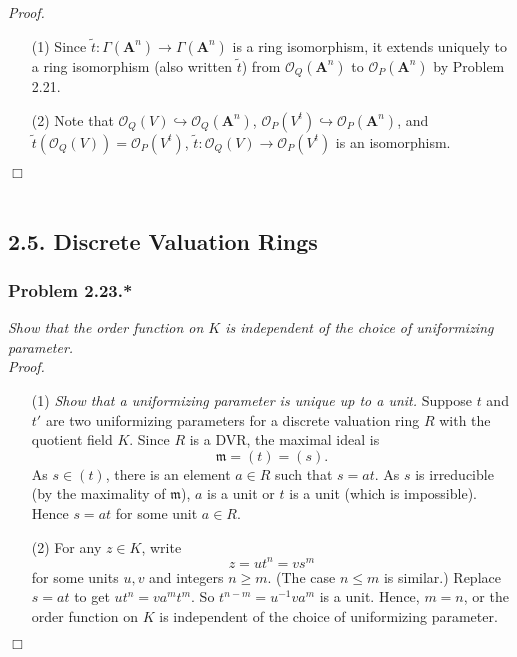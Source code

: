 \documentclass{article}
\begin{document}
\emph{Proof.}
\begin{enumerate}
\item[(1)]
  Since $\widetilde{t}: \Gamma(\mathbf{A}^{n}) \to \Gamma(\mathbf{A}^{n})$ is a ring isomorphism,
  it extends uniquely to a ring isomorphism (also written $\widetilde{t}$)
  from $\mathscr{O}_Q(\mathbf{A}^{n})$ to $\mathscr{O}_P(\mathbf{A}^{n})$
  by Problem 2.21.

\item[(2)]
  Note that $\mathscr{O}_Q(V) \hookrightarrow \mathscr{O}_Q(\mathbf{A}^{n})$,
  $\mathscr{O}_P(V^{t}) \hookrightarrow \mathscr{O}_P(\mathbf{A}^{n})$,
  and $\widetilde{t}(\mathscr{O}_Q(V)) = \mathscr{O}_P(V^{t})$,
  $\widetilde{t}: \mathscr{O}_Q(V) \to \mathscr{O}_P(V^{t})$ is an isomorphism.
\end{enumerate}
$\Box$ \\\\






\subsection*{2.5. Discrete Valuation Rings \\}



\subsubsection*{Problem 2.23.*}
\emph{Show that the order function on $K$ is independent of the choice of uniformizing parameter.} \\

\emph{Proof.}
\begin{enumerate}
\item[(1)]
  \emph{Show that a uniformizing parameter is unique up to a unit.}
  Suppose $t$ and $t'$ are two uniformizing parameters
  for a discrete valuation ring $R$ with the quotient field $K$.
  Since $R$ is a DVR, the maximal ideal is
  \[
    \mathfrak{m} = (t) = (s).
  \]
  As $s \in (t)$, there is an element $a \in R$ such that $s = at$.
  As $s$ is irreducible (by the maximality of $\mathfrak{m}$),
  $a$ is a unit or $t$ is a unit (which is impossible).
  Hence $s = at$ for some unit $a \in R$.

\item[(2)]
  For any $z \in K$, write
  \[
    z = ut^n = v{s}^{m}
  \]
  for some units $u, v$ and integers $n \geq m$. (The case $n \leq m$ is similar.)
  Replace $s = at$ to get $u t^n = v a^m t^m$.
  So $t^{n - m} = u^{-1}v a^m$ is a unit.
  Hence, $m = n$, or the order function on $K$ is independent of the choice of uniformizing parameter.
\end{enumerate}
$\Box$ \\\\
\end{document}
